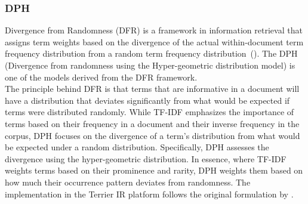 \subsubsection{DPH}\label{sec:dph}
Divergence from Randomness (DFR) is a framework in information retrieval that assigns term weights based on the divergence of the actual within-document term frequency distribution from a random term frequency distribution~(\cite{amati:2006}).
The DPH (Divergence from randomness using the Hyper-geometric distribution model) is one of the models derived from the DFR framework.
\\
The principle behind DFR is that terms that are informative in a document will have a distribution that deviates significantly from what would be expected if terms were distributed randomly.
While TF-IDF emphasizes the importance of terms based on their frequency in a document and their inverse frequency in the corpus, DPH focuses on the divergence of a term's distribution from what would be expected under a random distribution.
Specifically, DPH assesses the divergence using the hyper-geometric distribution.
In essence, where TF-IDF weights terms based on their prominence and rarity, DPH weights them based on how much their occurrence pattern deviates from randomness.
The implementation in the Terrier IR platform follows the original formulation by \cite{amati:2006}.


